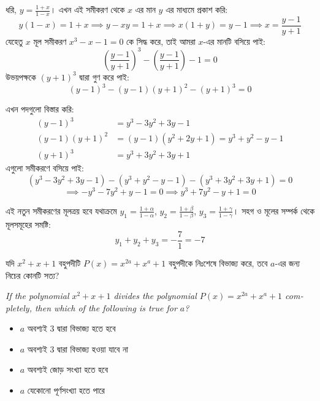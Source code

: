 \documentclass[12pt, a4paper]{article}
\begin{document}
\begin{tcolorbox}[solutionbox={সমাধান (Solution)}]
    \noindent
    ধরি, $y = \frac{1+x}{1-x}$। এখন এই সমীকরণ থেকে $x$ এর মান $y$ এর মাধ্যমে প্রকাশ করি:
    \[ y(1-x) = 1+x \implies y - xy = 1+x \implies x(1+y) = y-1 \implies x = \frac{y-1}{y+1} \]
    যেহেতু $x$ মূল সমীকরণ $x^3 - x - 1 = 0$ কে সিদ্ধ করে, তাই আমরা $x$-এর মানটি বসিয়ে পাই:
    \[ \left(\frac{y-1}{y+1}\right)^3 - \left(\frac{y-1}{y+1}\right) - 1 = 0 \]
    উভয়পক্ষকে $(y+1)^3$ দ্বারা গুণ করে পাই:
    \[ (y-1)^3 - (y-1)(y+1)^2 - (y+1)^3 = 0 \]
    
    \vspace{0.5em}
    এখন পদগুলো বিস্তার করি:
    \begin{align*}
        (y-1)^3 &= y^3 - 3y^2 + 3y - 1 \\
        (y-1)(y+1)^2 &= (y-1)(y^2 + 2y + 1) = y^3 + y^2 - y - 1 \\
        (y+1)^3 &= y^3 + 3y^2 + 3y + 1
    \end{align*}
    এগুলো সমীকরণে বসিয়ে পাই:
    \[ (y^3 - 3y^2 + 3y - 1) - (y^3 + y^2 - y - 1) - (y^3 + 3y^2 + 3y + 1) = 0 \]
    \[ \implies -y^3 - 7y^2 + y - 1 = 0 \implies y^3 + 7y^2 - y + 1 = 0 \]
    
    \vspace{0.5em}
    এই নতুন সমীকরণের মূলত্রয় হবে যথাক্রমে $y_1 = \frac{1+\alpha}{1-\alpha}$, $y_2 = \frac{1+\beta}{1-\beta}$, $y_3 = \frac{1+\gamma}{1-\gamma}$। 
    সহগ ও মূলের সম্পর্ক থেকে মূলসমূহের সমষ্টি:
    \[ y_1 + y_2 + y_3 = -\frac{7}{1} = -7 \]
\end{tcolorbox}
\begin{tcolorbox}[questionbox={প্রশ্ন (Question) 37}]
    \noindent
    যদি $x^2 + x + 1$ বহুপদীটি $P(x) = x^{2a} + x^a + 1$ বহুপদীকে নিঃশেষে বিভাজ্য করে, তবে $a$-এর জন্য নিচের কোনটি সত্য?
    
    \vspace{0.8em}
    \begin{english}
    \noindent\textit{\color{darkgray}
    If the polynomial $x^2 + x + 1$ divides the polynomial $P(x) = x^{2a} + x^a + 1$ completely, then which of the following is true for $a$?
    }
    \end{english}
\end{tcolorbox}

\begin{itemize}[label={}, leftmargin=1cm, itemsep=0.5em]
    \item[\textbf{A)}] $a$ অবশ্যই $3$ দ্বারা বিভাজ্য হতে হবে
    \item[\textbf{B)}] $a$ অবশ্যই $3$ দ্বারা বিভাজ্য হওয়া যাবে না
    \item[\textbf{C)}] $a$ অবশ্যই জোড় সংখ্যা হতে হবে
    \item[\textbf{D)}] $a$ যেকোনো পূর্ণসংখ্যা হতে পারে
\end{itemize}
\end{document}
